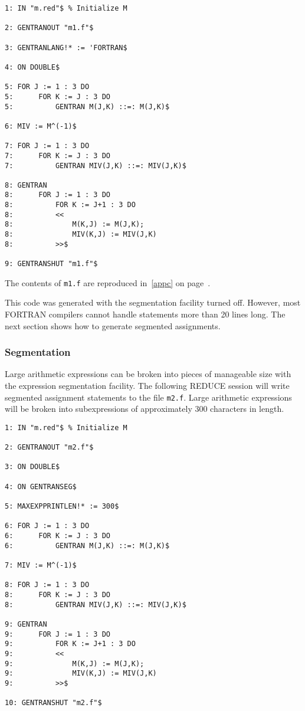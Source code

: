 \begin{verbatim}
1: IN "m.red"$ % Initialize M

2: GENTRANOUT "m1.f"$ 

3: GENTRANLANG!* := 'FORTRAN$

4: ON DOUBLE$

5: FOR J := 1 : 3 DO 
5:      FOR K := J : 3 DO 
5:          GENTRAN M(J,K) ::=: M(J,K)$

6: MIV := M^(-1)$ 

7: FOR J := 1 : 3 DO 
7:      FOR K := J : 3 DO 
7:          GENTRAN MIV(J,K) ::=: MIV(J,K)$

8: GENTRAN 
8:      FOR J := 1 : 3 DO 
8:          FOR K := J+1 : 3 DO 
8:          << 
8:              M(K,J) := M(J,K); 
8:              MIV(K,J) := MIV(J,K) 
8:          >>$ 

9: GENTRANSHUT "m1.f"$
\end{verbatim}
The contents of {\tt m1.f} are reproduced in~\ref{appc} on page~\pageref{appc}.

This code was generated with the segmentation facility turned off.  However,
most FORTRAN compilers cannot handle statements more than 20 lines
long.  The next section shows how to generate segmented assignments.

\subsubsection{Segmentation}
\label{seg:example}
Large arithmetic expressions can be broken into pieces of manageable
size with the expression segmentation facility.  The following REDUCE
session will write segmented assignment statements to the
file {\tt m2.f}.  Large arithmetic expressions will be broken into
subexpressions of approximately 300 characters in length.

\begin{verbatim}
1: IN "m.red"$ % Initialize M

2: GENTRANOUT "m2.f"$ 

3: ON DOUBLE$

4: ON GENTRANSEG$ 

5: MAXEXPPRINTLEN!* := 300$ 

6: FOR J := 1 : 3 DO 
6:      FOR K := J : 3 DO 
6:          GENTRAN M(J,K) ::=: M(J,K)$ 

7: MIV := M^(-1)$ 

8: FOR J := 1 : 3 DO 
8:      FOR K := J : 3 DO 
8:          GENTRAN MIV(J,K) ::=: MIV(J,K)$ 

9: GENTRAN 
9:      FOR J := 1 : 3 DO 
9:          FOR K := J+1 : 3 DO 
9:          << 
9:              M(K,J) := M(J,K); 
9:              MIV(K,J) := MIV(J,K) 
9:          >>$ 

10: GENTRANSHUT "m2.f"$ 
\end{verbatim}

